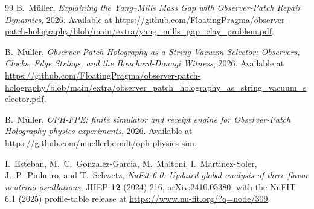 \begin{thebibliography}{99}
B.~M\"uller,
\emph{Explaining the Yang--Mills Mass Gap with Observer-Patch Repair Dynamics},
2026.
Available at \url{https://github.com/FloatingPragma/observer-patch-holography/blob/main/extra/yang_mills_gap_clay_problem.pdf}.

B.~M\"uller,
\emph{Observer-Patch Holography as a String-Vacuum Selector: Observers, Clocks, Edge Strings, and the Bouchard-Donagi Witness},
2026.
Available at \url{https://github.com/FloatingPragma/observer-patch-holography/blob/main/extra/observer_patch_holography_as_string_vacuum_selector.pdf}.

B.~M\"uller,
\emph{OPH-FPE: finite simulator and receipt engine for Observer-Patch Holography physics experiments},
2026.
Available at \url{https://github.com/muellerberndt/oph-physics-sim}.

I.~Esteban, M.~C.~Gonzalez-Garcia, M.~Maltoni, I.~Martinez-Soler, J.~P.~Pinheiro, and T.~Schwetz,
\emph{NuFit-6.0: Updated global analysis of three-flavor neutrino oscillations},
JHEP \textbf{12} (2024) 216, arXiv:2410.05380,
with the NuFIT 6.1 (2025) profile-table release at
\url{https://www.nu-fit.org/?q=node/309}.



\end{thebibliography}
